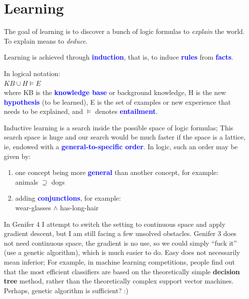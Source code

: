 \documentclass[12pt]{article}
\newcommand{\concept}[1]{\textbf{\textcolor{blue}{#1}}}
\newcommand{\formula}[1]{\ttfamily\textcolor{LogicColor}{#1}\rmfamily}
\newcommand{\tab}{\hspace*{1cm}}
\begin{document}
\section{Learning}

The goal of learning is to discover a bunch of logic formulas to \textit{explain} the world.  To explain means to \textit{deduce}.

Learning is achieved through \concept{induction}, that is, to induce \concept{rules} from \concept{facts}.  

In logical notation:\\
\tab $KB \cup H \models E$\\
where KB is the \concept{knowledge base} or background knowledge, H is the new \concept{hypothesis} (to be learned), E is the set of examples or new experience that needs to be explained, and $\models$ denotes \concept{entailment}.

Inductive learning is a search inside the possible space of logic formulas; This search space is huge and our search would be much faster if the space is a lattice, ie, endowed with a \concept{general-to-specific order}. In logic, such an order may be given by:
\begin{enumerate}
\item one concept being more \concept{general} than another concept, for example:\\
\tab \formula{animals $\supseteq$ dogs}
\item adding \concept{conjunctions}, for example:\\
\tab \formula{wear-glasses $\wedge$ has-long-hair}
\end{enumerate}

In Genifer 4 I attempt to switch the setting to continuous space and apply gradient descent, but I am still facing a few unsolved obstacles.  Genifer 3 does not need continuous space, the gradient is no use, so we could simply ``fuck it'' (use a genetic algorithm), which is much easier to do.  Easy does not necessarily mean inferior;  For example, in machine learning competitions, people find out that the most efficient classifiers are based on the theoretically simple \textbf{decision tree} method, rather than the theoretically complex support vector machines.  Perhaps, genetic algorithm is sufficient? :)
\end{document}
